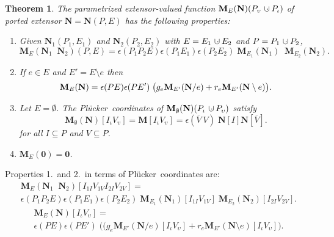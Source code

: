 \documentclass[12pt]{article}
\newtheorem{theorem}{Theorem}[section]
\theoremstyle{definition}
\newcommand{\dunion}
{\mbox{\hbox{\hskip6pt$\cdot$\hskip-5.50pt$\cup$\hskip2pt}}}
\newcommand{\scomp}[1]{\ensuremath{\overline{#1}}}
\newcommand{\scma}{\ensuremath{\ }}
\newcommand{\Is}{\ensuremath{\iota}}
\newcommand{\Vs}{\ensuremath{\upsilon}}
\newcommand{\ext}[1]{\ensuremath{\mathbf{#1}}}
\newcommand{\extvee}{\;\;}
\newcommand{\Plucker}{Pl\"{u}cker\ }
\begin{document}
\begin{theorem}
\label{TheoremMain}
The parametrized extensor-valued function 
$\ext{M}_E(\ext{N})(P_\Vs\dunion P_\Is)$ of ported extensor
$\ext{N}=\ext{N}(P,E)$
has the following properties:
\begin{enumerate}
\item
Given $\ext{N}_1(P_1,E_1)$ 
and $\ext{N}_2(P_2,E_2)$ with $E=E_1\dunion E_2$ and 
$P=P_1\dunion P_2$,
\begin{equation}
   \ext{M}_E(\ext{N}_1\extvee\ext{N}_2)(P,E) =
   \epsilon(P_1P_2E)\epsilon(P_1E_1)\epsilon(P_2E_2)\;
   \ext{M}_{E_1}(\ext{N}_1)\extvee
   \ext{M}_{E_2}(\ext{N}_2).
\end{equation}

\item
If $e\in E$ and $E'=E\setminus e$ then
\begin{equation}
   \ext{M}_E(\ext{N}) = \\
   \epsilon(PE)\epsilon(PE')\;
   \big(
   g_e\ext{M}_{E'}(\ext{N}/ e)
   +
   r_e\ext{M}_{E'}(\ext{N}\setminus e)\big).
\end{equation}
\item
Let $E=\emptyset$.  The \Plucker coordinates of 
$\ext{M}_\emptyset(\ext{N})(P_\Is\dunion P_\Vs)$ satisfy
\[
   \ext{M}_\emptyset(\ext{N})[I_{\Is}V_{\Vs}]=\ext{M}[I_{\Is}V_{\Vs}]=
    \epsilon(\scomp{V}\scma V)\;\ext{N}[I]\ext{N}[\scomp{V}].
\]
for all $I\subseteq P$ and $V\subseteq P$.

\item $\ext{M}_E(\ext{0}) = \ext{0}$.

\end{enumerate}
\end{theorem}

Properties 1.\  and 2.\  in terms of \Plucker coordinates are:
\begin{eqnarray}
\label{Thm10Pt1LHS}
\nonumber   \ext{M}_E(\ext{N}_1\extvee\ext{N}_2)[I_{1I}V_{1V}I_{2I}V_{2V}] =\\ 
   \epsilon(P_1P_2E)\epsilon(P_1E_1)\epsilon(P_2E_2)\;
   \ext{M}_{E_1}(\ext{N}_1)[I_{1I}V_{1V}]\;
     \ext{M}_{E_2}(\ext{N}_2)[I_{2I}V_{2V}].
\end{eqnarray}
\begin{eqnarray}
\nonumber   \ext{M}_E(\ext{N})[I_\Is V_\Vs]  = \\
   \epsilon(PE)\epsilon(PE')\;
   \big(
   (g_e\ext{M}_{E'}(\ext{N}/ e)[I_\Is V_\Vs]
   +
   r_e\ext{M}_{E'}(\ext{N}\setminus e)[I_\Is V_\Vs]\big).
\end{eqnarray}
\end{document}
